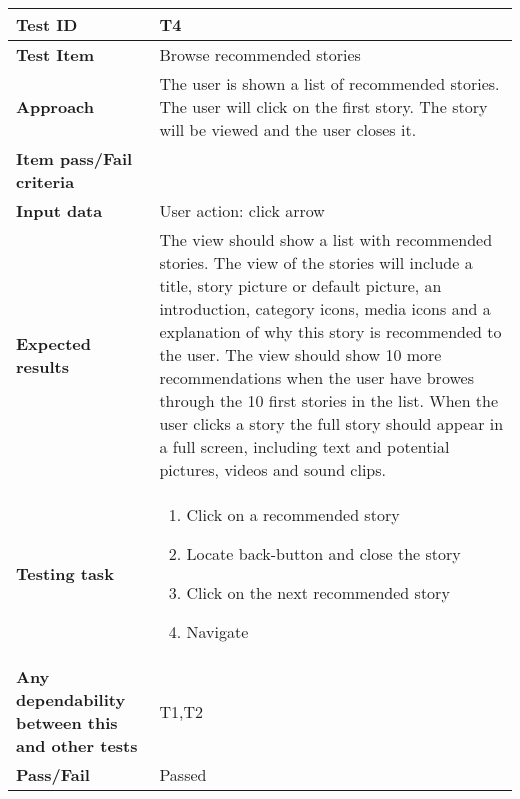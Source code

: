 \begin{center}
	\begin{table}[H]
		\begin{tabular}{ | p{4cm} | p{12cm}  |}
			\hline
			\hline
			\textbf{Test ID} & T4  \\ \hline
			\textbf{Test Item} & Browse recommended stories \\ \hline
			\textbf{Approach} & The user is shown a list of recommended stories. The user will click on the first story. The story will be viewed and the user closes it. 
			  \\ \hline
			\textbf{Item pass/Fail criteria} &  \\ \hline			
			\textbf{Input data} &  User action: click arrow\\ \hline
			\textbf{Expected results} & The view should show a list with recommended stories. The view of the stories will include a title, story picture or default picture, an introduction, category icons, media icons and a explanation of why this story is recommended to the user.  The view should show 10 more recommendations when the user have browes through the 10 first stories in the list.
			When the user clicks a story the full story should appear in a full screen, including text and potential pictures, videos and sound clips.   \\ \hline
			\textbf{Testing task} & 
			\begin{enumerate}[noitemsep]
			\item Click on a recommended story
			\item Locate back-button and close the story
			\item Click on the next recommended story
			\item Navigate 
			\end{enumerate}
			\\ \hline
			\textbf{Any dependability between this and other tests} & T1,T2 \\ \hline		
			\textbf{Pass/Fail} & Passed \\\hline			
		\end{tabular}
	\caption{}
	\label{Tab_systemTesting4}
	\end{table}
\end{center}


